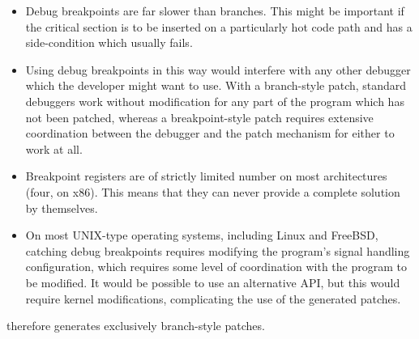 \begin{itemize}
\item
  Debug breakpoints are far slower than branches.  This might be
  important if the critical section is to be inserted on a
  particularly hot code path and has a side-condition which usually
  fails.
\item
  Using debug breakpoints in this way would interfere with any other
  debugger which the developer might want to use.  With a branch-style
  patch, standard debuggers work without modification for any part of
  the program which has not been patched, whereas a breakpoint-style
  patch requires extensive coordination between the debugger and the
  patch mechanism for either to work at all.
\item
  Breakpoint registers are of strictly limited number on most
  architectures (four, on x86).  This means that they can never
  provide a complete solution by themselves.
\item
  On most UNIX-type operating systems, including Linux and FreeBSD,
  catching debug breakpoints requires modifying the program's signal
  handling configuration, which requires some level of coordination
  with the program to be modified.  It would be possible to use an
  alternative API, but this would require kernel modifications,
  complicating the use of the generated patches.
\end{itemize}

{\Implementation} therefore generates exclusively branch-style patches.
